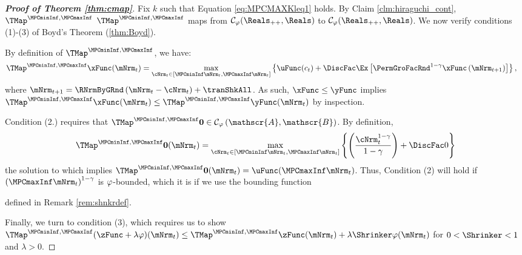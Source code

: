 \documentclass[\econtexRoot/BufferStockTheory]{subfiles}
\begin{document}
\begin{proof}[\textbf{Proof of Theorem \ref{thm:cmap}}]
Fix $k$ such that Equation \eqref{eq:MPCMAXKleq1} holds.
By Claim \ref{clm:hiraguchi_cont}, $\TMap^{\MPCminInf, \MPCmaxInf}$  $\TMap^{\MPCminInf, \MPCmaxInf}$ maps from $\mathcal{C}_{\boundFunc}(\Reals_{++},\Reals)$ to $\mathcal{C}_{\boundFunc}(\Reals_{++},\Reals)$.
We now verify conditions (1)-(3) of Boyd's Theorem (\ref{thm:Boyd}).


 By definition of $\TMap^{\MPCminInf, \MPCmaxInf}$, we have: 
\begin{equation}\begin{gathered}\begin{aligned}
  \TMap^{\MPCminInf, \MPCmaxInf}{\mathfrak{\xFunc}}(\mNrm_{t}) & = \underset{\cNrm_{t} \in
                                            [\MPCminInf \mNrm_{t}, \MPCmaxInf \mNrm_{t}]
                                            }\max \left\{
                                            \uFunc(c_{t})+\DiscFac \Ex\left[ {\PermGroFacRnd}^{1-\CRRA }{\mathfrak{\xFunc}}
                                            \left( {\mNrm}_{t+1}\right) \right] \right\},    \label{eq:condition1}
\end{aligned}\end{gathered}\end{equation}%
%
where ${\mNrm}_{t+1} = \RNrmByGRnd\left(\mNrm_{t} - \cNrm_{t}\right) + \tranShkAll$.
As such, ${\mathfrak{\xFunc}} \leq {\mathfrak{\yFunc}}$ implies $\TMap^{\MPCminInf, \MPCmaxInf}{\mathfrak{\xFunc}}(\mNrm_{t}) \leq \TMap^{\MPCminInf, \MPCmaxInf}{\mathfrak{\yFunc}} (\mNrm_{t})$ by inspection.

  Condition (2.) requires that $\TMap^{\MPCminInf, \MPCmaxInf}\mathbf{0}\in \mathcal{C}_{\boundFunc}\left(\mathscr{A},\mathscr{B}\right)$.
By definition,
\begin{equation*}
  \TMap^{\MPCminInf, \MPCmaxInf} \mathbf{0}(\mNrm_{t}) = \max_{\cNrm_{t} \in
    [\MPCminInf \mNrm_{t}, \MPCmaxInf \mNrm_{t}]
  }\left\{ \left( \frac{\cNrm_{t}^{1-\CRRA }}{1-\CRRA }\right) +\DiscFac 0\right\}
\end{equation*}
the solution to which implies
$\TMap^{\MPCminInf, \MPCmaxInf} \mathbf{0}(\mNrm_{t}) = \uFunc(\MPCmaxInf \mNrm_{t})$.
Thus, Condition (2)
will hold if ${(\MPCmaxInf \mNrm_{t})}^{1-\CRRA}$ is $\varphi$-bounded, which it is if we use the
bounding function

defined in Remark \ref{rem:shnkrdef}.


 Finally, we turn to condition (3), which requires us to show $\TMap^{\MPCminInf, \MPCmaxInf}({\zFunc} +\lambda\boundFunc
)(\mNrm_{t}) \leq\TMap^{\MPCminInf, \MPCmaxInf}{\zFunc}(\mNrm_{t}) +\lambda \Shrinker
\boundFunc(\mNrm_{t})$ for $0<\Shrinker<1$ and $\lambda>0$.


\end{proof}
\end{document}
